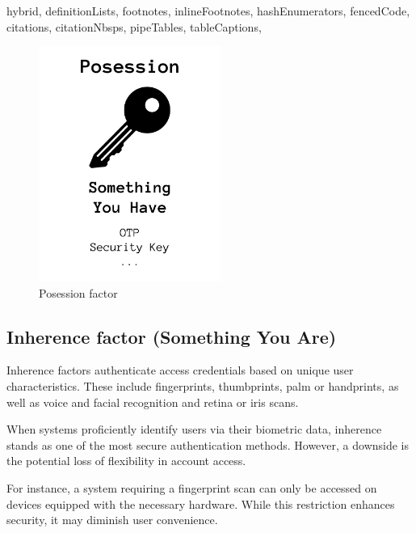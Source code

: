 \documentclass[
  digital,     %
  oneside,     %
  nosansbold,  %
  nocolorbold, %
  lof,         %
  lot,         %
]{fithesis4}
\begin{document}
\begin{markdown*}{%
  hybrid,
  definitionLists,
  footnotes,
  inlineFootnotes,
  hashEnumerators,
  fencedCode,
  citations,
  citationNbsps,
  pipeTables,
  tableCaptions,
}
\begin{figure}[htbp]
  \centering
  \includegraphics[width=0.53\textwidth]{img/posession-final.png}
  \caption{Posession factor}
  \label{fig:posession-factor}
\end{figure}

\newpage
\subsection{Inherence factor (Something You Are)}
Inherence factors authenticate access credentials based on unique user characteristics.
These include fingerprints, thumbprints, palm or handprints, as well as voice and facial recognition and retina or iris scans.

When systems proficiently identify users via their biometric data, inherence stands as one of the most secure authentication methods.
However, a downside is the potential loss of flexibility in account access.

For instance, a system requiring a fingerprint scan can only be accessed on devices equipped with the necessary hardware.
While this restriction enhances security, it may diminish user convenience.


\end{markdown*}
\end{document}
